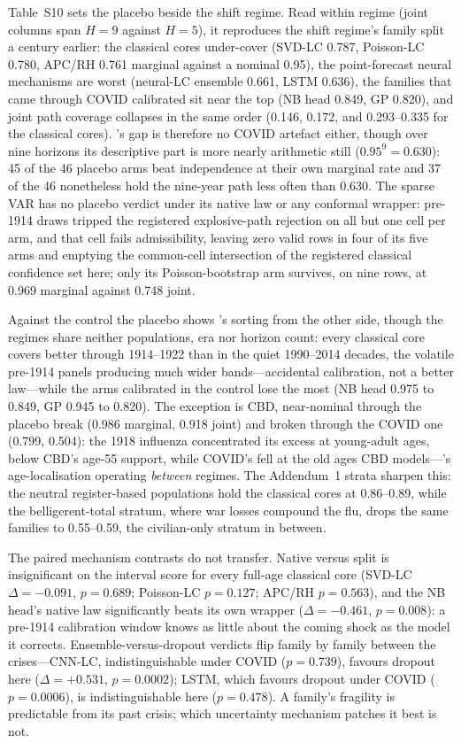 Table~S10 sets the placebo beside the shift regime. Read within regime (joint
columns span $H=9$ against $H=5$), it reproduces the shift regime's family split
a century earlier: the classical cores under-cover (SVD-LC 0.787, Poisson-LC
0.780, APC/RH 0.761 marginal against a nominal 0.95), the point-forecast neural
mechanisms are worst (neural-LC ensemble 0.661, LSTM 0.636), the families that
came through COVID calibrated sit near the top (NB head 0.849, GP 0.820), and
joint path coverage collapses in the same order (0.146, 0.172, and 0.293--0.335
for the classical cores). \Hthree's gap is therefore no COVID artefact either,
though over nine horizons its descriptive part is more nearly arithmetic still
($0.95^9 = 0.630$): 45 of the 46 placebo arms beat independence at their own
marginal rate and 37 of the 46 nonetheless hold the nine-year path less often
than 0.630. The sparse VAR has no placebo verdict under its native law or any
conformal wrapper: pre-1914 draws tripped the registered explosive-path
rejection on all but one cell per arm, and that cell fails admissibility,
leaving zero valid rows in four of its five arms and emptying the common-cell
intersection of the registered classical confidence set here; only its
Poisson-bootstrap arm survives, on nine rows, at 0.969 marginal against 0.748
joint.

Against the control the placebo shows \Htwo's sorting from the other side,
though the regimes share neither populations, era nor horizon count: every
classical core covers better through 1914--1922 than in the quiet 1990--2014
decades, the volatile pre-1914 panels producing much wider bands---accidental
calibration, not a better law---while the arms calibrated in the control lose
the most (NB head 0.975 to 0.849, GP 0.945 to 0.820). The exception is CBD,
near-nominal through the placebo break (0.986 marginal, 0.918 joint) and broken
through the COVID one (0.799, 0.504): the 1918 influenza concentrated its excess
at young-adult ages, below CBD's age-55 support, while COVID's fell at the old
ages CBD models---\Hfour's age-localisation operating \emph{between} regimes.
The Addendum~1 strata sharpen this: the neutral register-based populations hold
the classical cores at 0.86--0.89, while the belligerent-total stratum, where
war losses compound the flu, drops the same families to 0.55--0.59, the
civilian-only stratum in between.

The paired mechanism contrasts do not transfer. Native versus split is
insignificant on the interval score for every full-age classical core (SVD-LC
$\Delta=-0.091$, $p=0.689$; Poisson-LC $p=0.127$; APC/RH $p=0.563$), and the NB
head's native law significantly beats its own wrapper ($\Delta=-0.461$,
$p=0.008$): a pre-1914 calibration window knows as little about the coming shock
as the model it corrects. Ensemble-versus-dropout verdicts flip family by family
between the crises---CNN-LC, indistinguishable under COVID ($p=0.739$), favours
dropout here ($\Delta=+0.531$, $p=0.0002$); LSTM, which favours dropout under
COVID ($p=0.0006$), is indistinguishable here ($p=0.478$). A family's fragility
is predictable from its past crisis; which uncertainty mechanism patches it best
is not.

